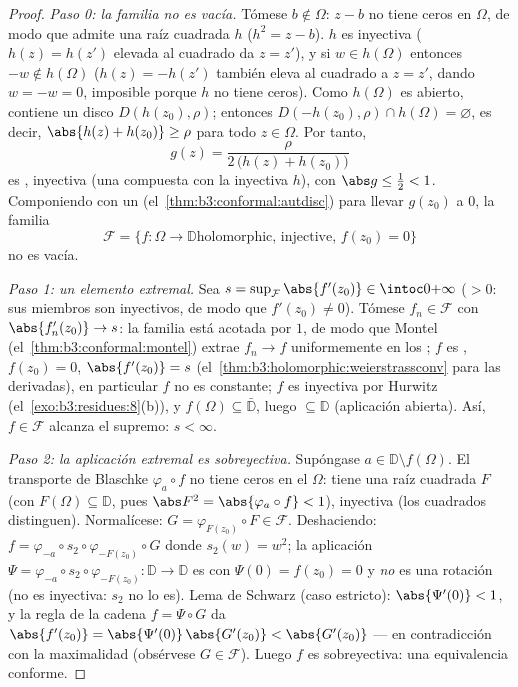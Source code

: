 \begin{proof}
\emph{Paso 0: la familia no es vacía.} Tómese $b \notin \Omega$: $z - b$
no tiene ceros en $\Omega$, de modo que admite una raíz cuadrada
 $h$ ($h^2 = z - b$). $h$ es
inyectiva ($h(z) =
h(z')$ elevada al cuadrado da $z = z'$), y si $w \in h(\Omega)$ entonces
$-w
\notin h(\Omega)$ ($h(z) = -h(z')$ también eleva al cuadrado a $z = z'$,
dando $w = -w = 0$, imposible porque $h$ no tiene ceros). Como
$h(\Omega)$ es abierto, contiene un disco $D(h(z_0), \rho)$; entonces
$D(-h(z_0), \rho) \cap h(\Omega) = \varnothing$, es decir,
$\abs{h(z) + h(z_0)} \geq \rho$ para todo $z \in \Omega$. Por tanto,
\[
g(z) = \frac{\rho}{2\,\bigl(h(z) + h(z_0)\bigr)}
\]
es , inyectiva (una
 compuesta con la inyectiva $h$), con
$\abs g \leq \frac12 < 1$. Componiendo con un
(el~\cref{thm:b3:conformal:autdisc}) para llevar $g(z_0)$ a $0$, la
familia
\[
\mathcal F = \{f \colon \Omega \to \mathbb D \text{
holomorphic, injective, } f(z_0) = 0\}
\]
no es vacía.

\emph{Paso 1: un elemento extremal.} Sea $s =
\sup_{\mathcal F}\abs{f'(z_0)} \in \intoc0{+\infty}$ ($> 0$: sus
miembros son inyectivos, de modo que $f'(z_0) \neq 0$). Tómese $f_n \in
\mathcal F$ con $\abs{f_n'(z_0)} \to s$: la familia está acotada por
$1$, de modo que Montel (el~\cref{thm:b3:conformal:montel}) extrae
$f_n \to f$ uniformemente en los
; $f$ es
, $f(z_0) = 0$,
$\abs{f'(z_0)} = s$ (el~\cref{thm:b3:holomorphic:weierstrassconv} para
las derivadas), en particular $f$ no es constante; $f$ es inyectiva por
Hurwitz (el~\cref{exo:b3:residues:8}(b)), y
$f(\Omega) \subseteq \bar{\mathbb D}$, luego $\subseteq
\mathbb D$ (aplicación abierta). Así, $f \in \mathcal F$ alcanza el
supremo: $s < \infty$.

\emph{Paso 2: la aplicación extremal es sobreyectiva.} Supóngase $a \in
\mathbb D\setminus f(\Omega)$. El transporte de Blaschke
$\varphi_a\circ f$ no tiene ceros en el
 $\Omega$:
tiene una raíz cuadrada  $F$
(con $F(\Omega) \subseteq \mathbb D$, pues $\abs F^2 =
\abs{\varphi_a\circ f} < 1$), inyectiva (los cuadrados distinguen).
Normalícese: $G = \varphi_{F(z_0)}\circ F \in
\mathcal F$. Deshaciendo: $f = \varphi_{-a}\circ s_2 \circ
\varphi_{-F(z_0)}\circ G$ donde $s_2(w) = w^2$; la aplicación $\Psi
= \varphi_{-a}\circ s_2\circ\varphi_{-F(z_0)} \colon \mathbb D
\to \mathbb D$ es  con
$\Psi(0) = f(z_0) = 0$ y \emph{no} es una rotación (no es inyectiva:
$s_2$ no lo es). Lema de Schwarz (caso estricto): $\abs{\Psi'(0)} < 1$,
y la regla de la cadena $f = \Psi\circ G$ da $\abs{f'(z_0)} =
\abs{\Psi'(0)}\,\abs{G'(z_0)} < \abs{G'(z_0)}$ --- en contradicción con
la maximalidad (obsérvese $G \in \mathcal F$). Luego $f$ es
sobreyectiva: una equivalencia conforme.


\end{proof}
